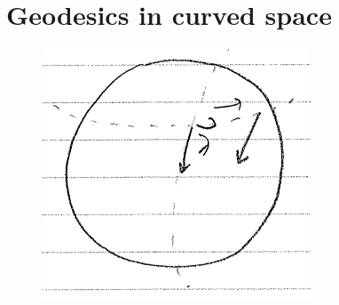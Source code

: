\documentclass{book}
\theoremstyle{definition}
\begin{document}
\section{Geodesics in curved space}


\begin{figure}[!htb]
	\centering
	\includegraphics[scale=0.7]{geod}
\end{figure}
\end{document}
